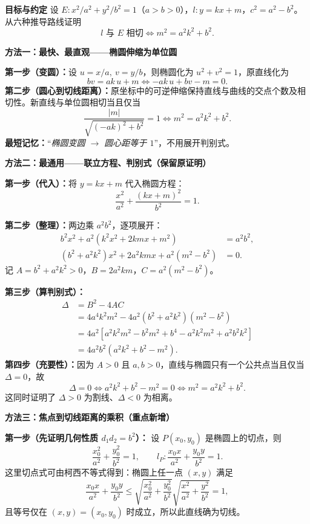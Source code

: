 \begin{proofbox}
\textbf{\textcolor{CProof}{目标与约定}}
设 $E:x^2/a^2+y^2/b^2=1$（$a>b>0$），$l:y=kx+m$，$c^2=a^2-b^2$。从六种推导路线证明
\[
\boxed{l\text{ 与 }E\text{ 相切}\iff m^2=a^2k^2+b^2.}
\]

\medskip
\textbf{\textcolor{CProof}{方法一：最快、最直观——椭圆伸缩为单位圆}}

\textbf{第一步（变圆）：}设 $u=x/a,\ v=y/b$，则椭圆化为 $u^2+v^2=1$，原直线化为
\[
 b v=ak\,u+m
 \iff -ak\,u+bv-m=0.
\]
\textbf{第二步（圆心到切线距离）：}原坐标中的可逆伸缩保持直线与曲线的交点个数及相切性。新直线与单位圆相切当且仅当
\[
 \frac{|m|}{\sqrt{(-ak)^2+b^2}}=1
 \iff \boxed{m^2=a^2k^2+b^2}.
\]
\textbf{最短记忆：}“\emph{椭圆变圆 $\to$ 圆心距等于 $1$}”，不用展开判别式。

\medskip
\textbf{\textcolor{CProof}{方法二：最通用——联立方程、判别式（保留原证明）}}

\textbf{第一步（代入）：}将 $y=kx+m$ 代入椭圆方程：
\[
 \frac{x^2}{a^2}+\frac{(kx+m)^2}{b^2}=1.
\]

\textbf{第二步（整理）：}两边乘 $a^2b^2$，逐项展开：
\[
\begin{aligned}
 b^2x^2+a^2(k^2x^2+2kmx+m^2)&=a^2b^2,\\
 (b^2+a^2k^2)x^2+2a^2kmx+a^2(m^2-b^2)&=0.
\end{aligned}
\]
记 $A=b^2+a^2k^2>0$，$B=2a^2km$，$C=a^2(m^2-b^2)$。

\textbf{第三步（算判别式）：}
\[
\begin{aligned}
 \Delta&=B^2-4AC\\
 &=4a^4k^2m^2-4a^2(b^2+a^2k^2)(m^2-b^2)\\
 &=4a^2\left[a^2k^2m^2-b^2m^2+b^4-a^2k^2m^2+a^2b^2k^2\right]\\
 &=\boxed{4a^2b^2(a^2k^2+b^2-m^2)}.
\end{aligned}
\]
\textbf{第四步（充要性）：}因为 $A>0$ 且 $a,b>0$，直线与椭圆只有一个公共点当且仅当 $\Delta=0$，故
\[
 \Delta=0\iff a^2k^2+b^2-m^2=0
 \iff \boxed{m^2=a^2k^2+b^2}.
\]
这同时证明了 $\Delta>0$ 为割线、$\Delta<0$ 为相离。

\medskip
\textbf{\textcolor{CProof}{方法三：焦点到切线距离的乘积（重点新增）}}

\textbf{第一步（先证明几何性质 $d_1d_2=b^2$）：}
设 $P(x_0,y_0)$ 是椭圆上的切点，则
\[
 \frac{x_0^2}{a^2}+\frac{y_0^2}{b^2}=1,
 \qquad l_P:\frac{x_0x}{a^2}+\frac{y_0y}{b^2}=1.
\]
这里切点式可由柯西不等式得到：椭圆上任一点 $(x,y)$ 满足
\[
 \frac{x_0x}{a^2}+\frac{y_0y}{b^2}
 \le \sqrt{\frac{x_0^2}{a^2}+\frac{y_0^2}{b^2}}
       \sqrt{\frac{x^2}{a^2}+\frac{y^2}{b^2}}=1,
\]
且等号仅在 $(x,y)=(x_0,y_0)$ 时成立，所以此直线确为切线。


\end{proofbox}
